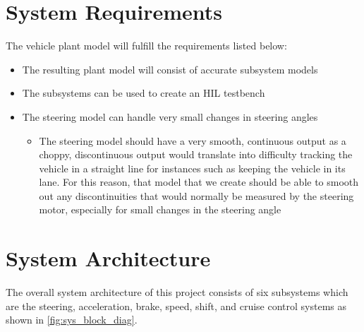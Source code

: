 \documentclass[letterpaper,12pt]{article}   %
\begin{document}
\section{System Requirements}
The vehicle plant model will fulfill the requirements listed below:
\begin{itemize}
    \item The resulting plant model will consist of accurate subsystem models
    \item The subsystems can be used to create an HIL testbench
    \item The steering model can handle very small changes in steering angles
    \begin{itemize}
    		\item The steering model should have a very smooth, continuous output as a choppy, discontinuous output would translate into difficulty tracking the vehicle in a straight line for instances such as keeping the vehicle in its lane. For this reason, that model that we create should be able to smooth out any discontinuities that would normally be measured by the steering motor, especially for small changes in the steering angle
    \end{itemize}
\end{itemize}


\section{System Architecture}
The overall system architecture of this project consists of six subsystems which are the steering, acceleration, brake, speed, shift, and cruise control systems as shown in \autoref{fig:sys_block_diag}.

\end{document}
